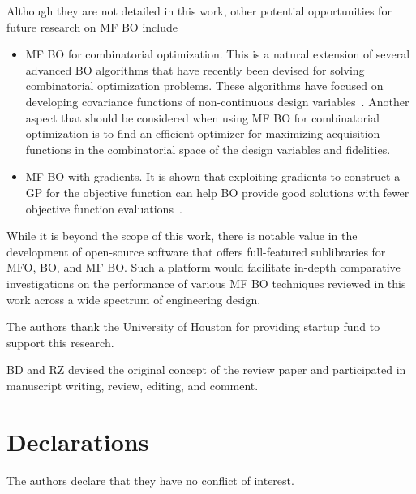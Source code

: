 \documentclass[iicol,sn-basic]{sn-jnl}%
\begin{document}
Although they are not detailed in this work, other potential opportunities for future research on MF BO include    
\begin{itemize}
	\item MF BO for combinatorial optimization. This is a natural extension of several advanced BO algorithms that have recently been devised for solving combinatorial optimization problems. These algorithms have focused on developing covariance functions of non-continuous design variables~\citep[see e.g.,][]{GomezBombarelli2018,GarridoMerchan2020,ZhangYi2020,Vangelatos2021}. Another aspect that should be considered when using MF BO for combinatorial optimization is to find an efficient optimizer for maximizing acquisition functions in the combinatorial space of the design variables and fidelities.
	
	\item MF BO with gradients. It is shown that exploiting gradients to construct a GP for the objective function can help BO provide good solutions with fewer objective function evaluations~\citep{WuJ2017}.
\end{itemize}

While it is beyond the scope of this work, there is notable value in the development of open-source software that offers full-featured sublibraries for MFO, BO, and MF BO.
Such a platform would facilitate in-depth comparative investigations on the performance of various MF BO techniques reviewed in this work across a wide spectrum of engineering design.

The authors thank the University of Houston for providing startup fund to support this research.

BD and RZ devised the original concept of the review paper and participated in manuscript writing, review, editing, and comment.

\section*{Declarations}
The authors declare that they have no conflict of interest.
\end{document}
